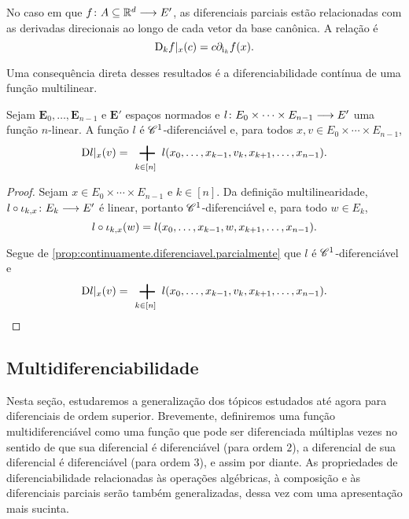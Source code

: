 No caso em que ${f}\colon {A \subseteq \mathbb{R}^d} \longrightarrow {E'}$, as diferenciais parciais estão relacionadas com as derivadas direcionais ao longo de cada vetor da base canônica. A relação é
	\begin{equation*}
	\mathrm{D}_k f|_x(c) = c \partial_{\mathrm{i}_k} f(x).
	\end{equation*}


Uma consequência direta desses resultados é a diferenciabilidade contínua de uma função multilinear.

\begin{proposition}
Sejam $\bm E_0, \ldots, \bm E_{n-1}$ e $\bm E'$ espaços normados e ${l}\colon {E_0 \times \cdots \times E_{n-1}} \longrightarrow {E'}$ uma função $n$-linear. A função $l$ é $\mathscr{C}^1$-diferenciável e, para todos $x,v \in E_0 \times \cdots \times E_{n-1}$,
	\begin{equation*}
	\D l|_x(v) = \sum_{k \in [n]} l(x_0,\ldots,x_{k-1},v_k,x_{k+1},\ldots,x_{n-1}).
	\end{equation*}
\end{proposition}
\begin{proof}
Sejam $x \in E_0 \times \cdots \times E_{n-1}$ e $k \in [n]$. Da definição multilinearidade, ${l \circ \iota_{k,x}}\colon {E_k} \longrightarrow {E'}$ é linear, portanto $\mathscr{C}^1$-diferenciável e, para todo $w \in E_k$,
	\begin{equation*}
	l \circ \iota_{k,x}(w) = l(x_0,\ldots,x_{k-1},w,x_{k+1},\ldots,x_{n-1}).
	\end{equation*}

Segue de \ref{prop:continuamente.diferenciavel.parcialmente} que $l$ é $\mathscr{C}^1$-diferenciável e
	\begin{equation*}
	\D l|_x(v) = \sum_{k \in [n]} l(x_0,\ldots,x_{k-1},v_k,x_{k+1},\ldots,x_{n-1}).
	\qedhere
	\end{equation*}
\end{proof}







\subsection{Multidiferenciabilidade}

Nesta seção, estudaremos a generalização dos tópicos estudados até agora para diferenciais de ordem superior. Brevemente, definiremos uma função multidiferenciável como uma função que pode ser diferenciada múltiplas vezes no sentido de que sua diferencial é diferenciável (para ordem $2$), a diferencial de sua diferencial é diferenciável (para ordem $3$), e assim por diante. As propriedades de diferenciabilidade relacionadas às operações algébricas, à composição e às diferenciais parciais serão também generalizadas, dessa vez com uma apresentação mais sucinta.

